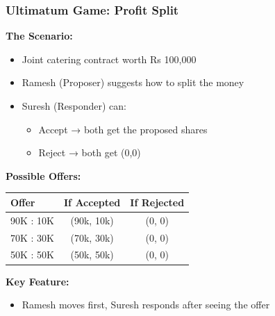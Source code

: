 \begin{frame}[fragile]\frametitle{Ultimatum Game: Profit Split}

\textbf{The Scenario:}
\begin{itemize}
  \item Joint catering contract worth Rs 100,000
  \item Ramesh (Proposer) suggests how to split the money
  \item Suresh (Responder) can:
  \begin{itemize}
    \item Accept → both get the proposed shares
    \item Reject → both get (0,0)
  \end{itemize}
\end{itemize}

\vspace{6pt}

\textbf{Possible Offers:}

\begin{center}
\begin{tabular}{|l|c|c|}
  \hline
  \textbf{Offer} & \textbf{If Accepted} & \textbf{If Rejected} \\
  \hline
  90K : 10K & (90k, 10k) & (0, 0) \\
  \hline
  70K : 30K & (70k, 30k) & (0, 0) \\
  \hline
  50K : 50K & (50k, 50k) & (0, 0) \\
  \hline
\end{tabular}
\end{center}

\vspace{6pt}

\textbf{Key Feature:}
\begin{itemize}
  \item Ramesh moves first, Suresh responds after seeing the offer
\end{itemize}

\end{frame}

